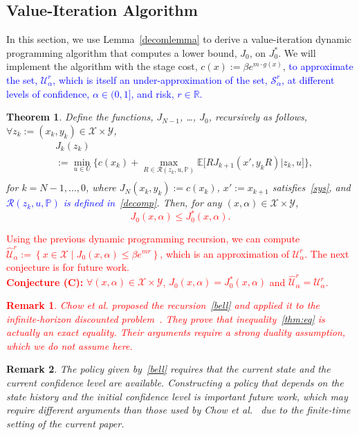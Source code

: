 \documentclass[letterpaper, 10 pt, conference]{ieeeconf}  %
\newtheorem{theorem}{Theorem}
\newtheorem{remark}{Remark}
\begin{document}
\subsection{Value-Iteration Algorithm}
In this section, we use Lemma~\ref{decomlemma} to derive a value-iteration dynamic programming algorithm that computes a lower bound, $J_0$, on $J_0^*$.
We will implement the algorithm with the stage cost, $c(x) := \beta e^{m \cdot g(x)}$, 
\textcolor{blue}{to approximate the set, $\mathcal{U}_\alpha^r$, which is itself an under-approximation of the set, $\mathcal{S}_\alpha^r$, 
at different levels of confidence, $\alpha \in (0, 1]$, and risk, $r \in \mathbb{R}$.} 
%
\begin{theorem}
\label{thm}
Define the functions, $J_{N-1}$, \dots, $J_0$, recursively as follows, $\forall z_k := (x_k, y_k) \in \mathcal{X} \times \mathcal{Y}$,
\begin{equation}\begin{aligned}
&J_k(z_k) \\
& := {\underset{u \in U}\min} \Big\{ c(x_k) + {\underset{R \in \mathcal{R}(z_k, u, \mathbb{P})}\max} \mathbb{E}\big[ R J_{k+1}(x', y_k R) \big| z_k, u \big] \Big\}, \\
\label{bell}\end{aligned}\end{equation}
for $k = N-1, \dots, 0$, where $J_N(x_k, y_k) := c(x_k)$, $x' := x_{k+1}$ satisfies~\eqref{sys}, and \textcolor{blue}{$\mathcal{R}(z_k, u, \mathbb{P})$ is defined in~\eqref{decomp}}.  
Then, for any $(x, \alpha) \in \mathcal{X} \times \mathcal{Y}$,
\textcolor{red}{
\begin{equation}
\label{thm:eq}
J_0(x,\alpha) \leq J_0^*(x, \alpha).
\end{equation}
}
\end{theorem}
%
\textcolor{red}{Using the previous dynamic programming recursion, we can compute $\widehat{\mathcal{U}}_{\alpha}^r := \left\{ x \in \mathcal{X} \mid J_0(x, \alpha) \leq \beta e^{m r}\right\}$, which is an approximation of $\mathcal{U}_{\alpha}^r$. The next conjecture is for future work.\\
\textbf{Conjecture (C):} $\forall(x, \alpha) \in \mathcal{X} \times \mathcal{Y}$, $J_0(x, \alpha) = J^*_0(x, \alpha)$ and $\widehat{\mathcal{U}}_{\alpha}^r = \mathcal{U}_{\alpha}^r$.
%
\begin{remark}
Chow et al. proposed the recursion~\eqref{bell} and applied it to the infinite-horizon discounted problem~\cite{chow2015risk}. They prove that inequality~\eqref{thm:eq} is actually an exact equality. Their arguments require a strong duality assumption, which we do not assume here.
\end{remark}
}
%
\begin{remark}
The policy given by~\eqref{bell} requires that the current state and the current confidence level are available.
Constructing a policy that depends on the state history and the initial confidence level is important future work,
which may require different arguments than those used by Chow et al.~\cite{chow2015risk} due to the finite-time setting of the current paper.  %
\end{remark} 
\end{document}
